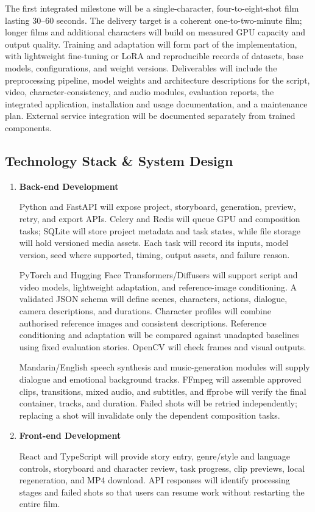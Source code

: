 \documentclass[a4paper,12pt]{article}
\begin{document}
The first integrated milestone will be a single-character, four-to-eight-shot film lasting 30--60 seconds. The delivery target is a coherent one-to-two-minute film; longer films and additional characters will build on measured GPU capacity and output quality. Training and adaptation will form part of the implementation, with lightweight fine-tuning or LoRA and reproducible records of datasets, base models, configurations, and weight versions. Deliverables will include the preprocessing pipeline, model weights and architecture descriptions for the script, video, character-consistency, and audio modules, evaluation reports, the integrated application, installation and usage documentation, and a maintenance plan. External service integration will be documented separately from trained components.

\subsection{Technology Stack \& System Design}
\begin{enumerate}
  \item \textbf{Back-end Development}\par
  Python and FastAPI will expose project, storyboard, generation, preview, retry, and export APIs. Celery and Redis will queue GPU and composition tasks; SQLite will store project metadata and task states, while file storage will hold versioned media assets. Each task will record its inputs, model version, seed where supported, timing, output assets, and failure reason.

  PyTorch and Hugging Face Transformers/Diffusers will support script and video models, lightweight adaptation, and reference-image conditioning. A validated JSON schema will define scenes, characters, actions, dialogue, camera descriptions, and durations. Character profiles will combine authorised reference images and consistent descriptions. Reference conditioning and adaptation will be compared against unadapted baselines using fixed evaluation stories. OpenCV will check frames and visual outputs.

  Mandarin/English speech synthesis and music-generation modules will supply dialogue and emotional background tracks. FFmpeg will assemble approved clips, transitions, mixed audio, and subtitles, and ffprobe will verify the final container, tracks, and duration. Failed shots will be retried independently; replacing a shot will invalidate only the dependent composition tasks.

  \item \textbf{Front-end Development}\par
  React and TypeScript will provide story entry, genre/style and language controls, storyboard and character review, task progress, clip previews, local regeneration, and MP4 download. API responses will identify processing stages and failed shots so that users can resume work without restarting the entire film.
\end{enumerate}
\end{document}
